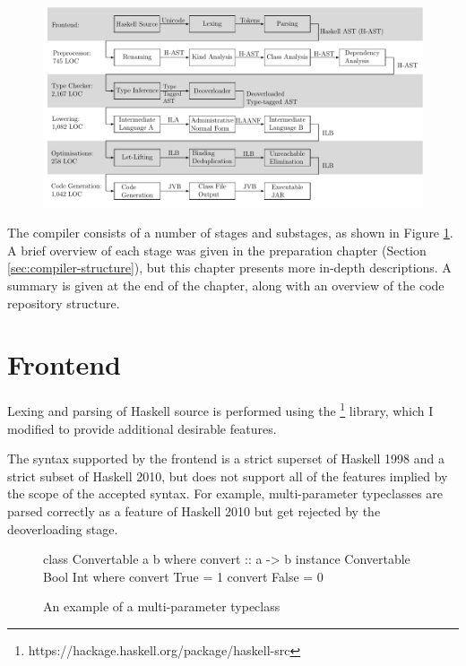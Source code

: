\documentclass[dissertation.tex]{subfiles}
\begin{document}
\begin{figure}[h]
    \includegraphics[width=\textwidth]{figures/compiler_layout.pdf}
    \caption{}
    \label{fig:compiler-layout}
\end{figure}

The compiler consists of a number of stages and substages, as shown in Figure \ref{fig:compiler-layout}. A brief overview of each stage was given in the preparation chapter (Section \ref{sec:compiler-structure}), but this chapter presents more in-depth descriptions. A summary is given at the end of the chapter, along with an overview of the code repository structure.

\section{Frontend}
{
    Lexing and parsing of Haskell source is performed using the \footnote{https://hackage.haskell.org/package/haskell-src} library, which I modified to provide additional desirable features.

    The syntax supported by the frontend is a strict superset of Haskell 1998 and a strict subset of Haskell 2010, but \compilername does not support all of the features implied by the scope of the accepted syntax. For example, multi-parameter typeclasses are parsed correctly as a feature of Haskell 2010 but get rejected by the deoverloading stage.

    \begin{figure}[h]
        \begin{haskellfigure}
        class Convertable a b where
            convert :: a -> b
        instance Convertable Bool Int where
            convert True = 1
            convert False = 0
        \end{haskellfigure}
        \caption{An example of a multi-parameter typeclass}
    \end{figure}

}
\end{document}

